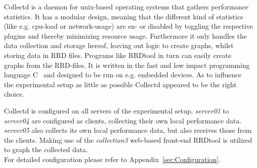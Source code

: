 Collectd is a daemon for unix-based operating systems that gathers performance statistics. It has a modular design, meaning that the different kind of statistics (like e.g. cpu-load or network-usage) are en- or disabled by toggling the respective plugins and thereby minimizing resource usage. Furthermore it only handles the data collection and storage hereof, leaving out logic to create graphs, whilst storing data in \ac{RRD} files. Programs like RRDtool in turn can easily create graphs from the RRD-files. It is written in the fast and low impact programming language C~\cite{prechelt2000empirical} and designed to be run on e.g. embedded devices.
As to influence the experimental setup as little as possible Collectd appeared to be the right choice.

Collectd is configured on all servers of the experimental setup. \emph{server01} to \emph{server04} are configured as clients, collecting their own local performance data. \emph{server05} also collects its own local performance data, but also receives those from the clients. Making use of the \emph{collection3} web-based front-end RRDtool is utilized to graph the collected data.
\\
For detailed configuration please refer to Appendix~\ref{sec:Configuration}.

